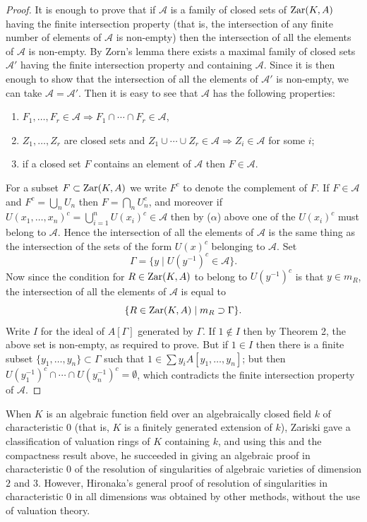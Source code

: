 \begin{proof}
It is enough to prove that if $\mathcal{A}$ is a family of closed sets of $\operatorname{Zar}(K, A)$
having the finite intersection property (that is, the intersection of any finite
number of elements of $\mathcal{A}$ is non-empty) then the intersection of all the
elements of $\mathcal{A}$ is non-empty. By Zorn's lemma there exists a maximal family
of closed sets $\mathcal{A}'$ having the finite intersection property and containing $\mathcal{A}$.
Since it is then enough to show that the intersection of all the elements of
$\mathcal{A}'$ is non-empty, we can take $\mathcal{A} = \mathcal{A}'$. Then it is easy to see that $\mathcal{A}$ has the
following properties:
\begin{enumerate}[($\alpha$)]
  \item $F_1, \ldots, F_r \in \mathcal{A} \Rightarrow F_1 \cap \cdots \cap F_r \in \mathcal{A}$,
  \item $Z_1, \ldots, Z_r$ are closed sets and $Z_1 \cup \cdots \cup Z_r \in \mathcal{A} \Rightarrow Z_i \in \mathcal{A}$ for some $i$;
  \item if a closed set $F$ contains an element of $\mathcal{A}$ then $F \in \mathcal{A}$.
\end{enumerate}
For a subset $F \subset \operatorname{Zar}(K, A)$ we write $F^c$ to denote the complement of $F$.
If $F \in \mathcal{A}$ and $F^c = \bigcup_n U_n$ then $F = \bigcap_n U_n^c$, and moreover if $U(x_1, \ldots, x_n)^c =
\bigcup_{i=1}^{n} U(x_i)^c \in \mathcal{A}$ then by ($\alpha$) above one of the $U(x_i)^c$ must belong to $\mathcal{A}$.
Hence the intersection of all the elements of $\mathcal{A}$ is the same thing as the
intersection of the sets of the form $U(x)^c$ belonging to $\mathcal{A}$. Set
\[
  \Gamma = \{y \mid U(y^{-1})^c \in \mathcal{A}\}.
\]
Now since the condition for $R \in \operatorname{Zar}(K, A)$ to belong to $U(y^{-1})^c$ is that
$y \in m_R$, the intersection of all the elements of $\mathcal{A}$ is equal to
\[
  \{R \in \operatorname{Zar}(K, A) \mid m_R \supset \Gamma\}.
\]
Write $I$ for the ideal of $A[\Gamma]$ generated by $\Gamma$. If $1 \notin I$ then by Theorem 2, the
above set is non-empty, as required to prove. But if $1 \in I$ then there is a
finite subset $\{y_1, \ldots, y_n\} \subset \Gamma$ such that $1 \in \sum y_iA[y_1, \ldots, y_n]$; but then
$U(y_1^{-1})^c \cap \cdots \cap U(y_n^{-1})^c = \emptyset$, which contradicts the finite intersection
property of $\mathcal{A}$.
\end{proof}

When $K$ is an algebraic function field over an algebraically closed field $k$
of characteristic $0$ (that is, $K$ is a finitely generated extension of $k$), Zariski
gave a classification of valuation rings of $K$ containing $k$, and using this and
the compactness result above, he succeeded in giving an algebraic proof in
characteristic $0$ of the resolution of singularities of algebraic varieties of
dimension $2$ and $3$. However, Hironaka's general proof of resolution of
singularities in characteristic $0$ in all dimensions was obtained by other
methods, without the use of valuation theory.

